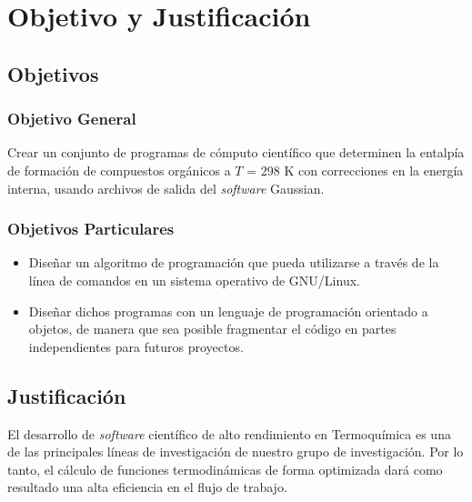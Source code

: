\chapter{Objetivo y Justificación}


\section{Objetivos}

\subsection{Objetivo General}
Crear un conjunto de programas de cómputo científico que determinen la entalpía de formación de compuestos orgánicos a $T$ = 298 K con correcciones en la energía interna, usando archivos de salida del \textit{software} Gaussian.\\

\subsection{Objetivos Particulares}

\begin{itemize}
\item Diseñar un algoritmo de programación que pueda utilizarse a través de la línea de comandos en un sistema operativo de GNU/Linux.

\item Diseñar dichos programas con un lenguaje de programación orientado a objetos, de manera que sea posible fragmentar el código en partes independientes para futuros proyectos.\\
\end{itemize}

\section{Justificación}
El desarrollo de \textit{software} científico de alto rendimiento en Termoquímica es una de las principales líneas de investigación de nuestro grupo de investigación. Por lo tanto, el cálculo de funciones termodinámicas de forma optimizada dará como resultado una alta eficiencia en el flujo de trabajo.
